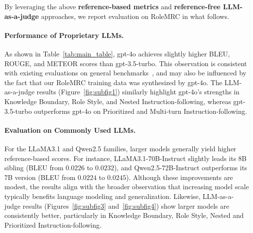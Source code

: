 



By leveraging the above \textbf{reference-based metrics} and \textbf{reference-free LLM-as-a-judge} approaches, we report evaluation on RoleMRC in what follows.

\paragraph{Performance of Proprietary LLMs.}
As shown in Table~\ref{tab:main_table}, gpt-4o achieves slightly higher BLEU, ROUGE, and METEOR scores than gpt-3.5-turbo. This observation is consistent with existing evaluations on general benchmarks~\cite{openai2023gpt4}, and may also be influenced by the fact that our RoleMRC training data was synthesized by gpt-4o. The LLM-as-a-judge results (Figure~\ref{fig:subfig1}) similarly highlight gpt-4o's strengths in Knowledge Boundary, Role Style, and Nested Instruction-following, whereas gpt-3.5-turbo outperforms gpt-4o on Prioritized and Multi-turn Instruction-following.

\paragraph{Evaluation on Commonly Used LLMs.}
For the LLaMA3.1 and Qwen2.5 families, larger models generally yield higher reference-based scores. For instance, LLaMA3.1-70B-Instruct slightly leads its 8B sibling (BLEU from $0.0226$ to $0.0232$), and Qwen2.5-72B-Instruct outperforms its 7B version (BLEU from $0.0224$ to $0.0245$). Although these improvements are modest, the results align with the broader observation that increasing model scale typically benefits language modeling and generalization. Likewise, LLM-as-a-judge results (Figures~\ref{fig:subfig3} and~\ref{fig:subfig4}) show larger models are consistently better, particularly in Knowledge Boundary, Role Style, Nested and Prioritized Instruction-following.

